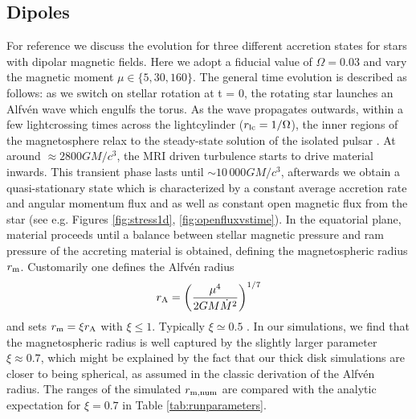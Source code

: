 \documentclass[fleqn,usenatbib]{mnras}
\begin{document}
\subsection{Dipoles}\label{sec:dipoles}
For reference we discuss the evolution for three different accretion states for stars with dipolar magnetic fields.  Here we adopt a fiducial value of $\Omega=0.03$ and vary the magnetic moment $\mu\in\{5,30,160\}$. The general time evolution is described as follows: as we switch on stellar rotation at t = 0, the rotating star launches an Alfv\'en wave which engulfs the torus. As the wave propagates outwards, within a few lightcrossing times across the lightcylinder ($r_{\rm lc} = 1/\Omega$), the inner regions of the magnetosphere relax to the steady-state solution of the isolated pulsar \citep{komissarov2006, Spitkovsky2006}. At around $\approx 2800 GM/c^3$, the MRI driven turbulence starts to drive material inwards. This transient phase lasts until $\sim 10\, 000 GM/c^3$, afterwards we obtain a quasi-stationary state which is characterized by a constant average accretion rate and angular momentum flux and as well as constant open magnetic flux from the star (see e.g. Figures \ref{fig:stress1d}, \ref{fig:openfluxvstime}).  
In the equatorial plane, material proceeds until a balance between stellar magnetic pressure and ram pressure of the accreting material is obtained, defining the magnetospheric radius $r_{\rm m}$.  
Customarily one defines the Alfv\'en radius
\begin{align}
    r_{\rm A} = \bigg(\frac{\mu^4}{2GM\dot{M}^2}\bigg)^{1/7}
    \label{eq:rm}
\end{align}
\citep{Elsner1977} and sets $r_{\rm m} = \xi r_{\rm A}$ with $\xi\le 1$.  Typically $\xi\simeq0.5$ \citep[e.g.][]{Bessolaz2008,Zanni2013}.  In our simulations, we find that the magnetospheric radius is well captured by the slightly larger parameter $\xi\approx 0.7$, which might be explained by the fact that our thick disk simulations are closer to being spherical, as assumed in the classic derivation of the Alfv\'en radius.  The ranges of the simulated $r_{\rm m, num}$ are compared with the analytic expectation for $\xi=0.7$ in Table \ref{tab:runparameters}.
\end{document}
